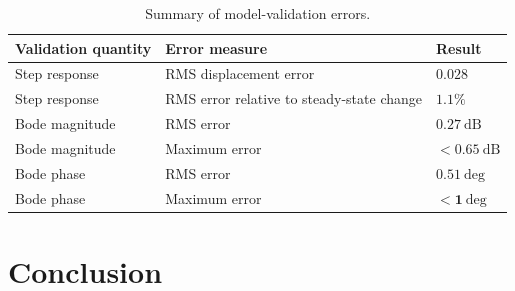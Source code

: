 \documentclass[12pt,a4paper]{article}
\begin{document}
\begin{table}[H]
    \centering
    \caption{Summary of model-validation errors.}
    \label{tab:validation}

    \renewcommand{\arraystretch}{1.35}

    \begin{tabular}{
        |>{\raggedright\arraybackslash}p{}
        |>{\raggedright\arraybackslash}p{}
        |>{\centering\arraybackslash}p{}|
    }
        \hline

        \rowcolor{gray!15}
        \textbf{Validation quantity} &
        \textbf{Error measure} &
        \textbf{Result} \\

        \hline

        Step response &
        RMS displacement error &
        $\mathbf{0.028}$ \\

        \hline

        Step response &
        RMS error relative to steady-state change &
        $\mathbf{1.1\%}$ \\

        \hline

        Bode magnitude &
        RMS error &
        $\mathbf{0.27}~\mathrm{dB}$ \\

        \hline

        Bode magnitude &
        Maximum error &
        $\mathbf{<0.65}~\mathrm{dB}$ \\

        \hline

        Bode phase &
        RMS error &
        $\mathbf{0.51}~\mathrm{deg}$ \\

        \hline

        Bode phase &
        Maximum error &
        $\mathbf{<1}~\mathrm{deg}$ \\

        \hline
    \end{tabular}
\end{table}




\section{Conclusion}
\end{document}
